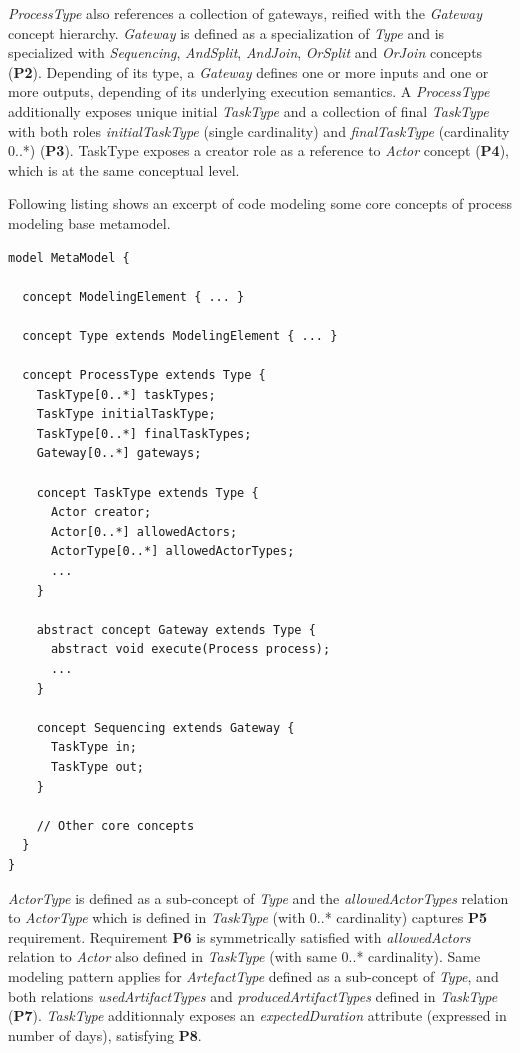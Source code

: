 \textit{ProcessType} also references a collection of gateways, reified with the \textit{Gateway} concept hierarchy. \textit{Gateway} is defined as a specialization of \textit{Type} and is specialized with \textit{Sequencing}, \textit{AndSplit}, \textit{AndJoin}, \textit{OrSplit} and \textit{OrJoin} concepts (\textbf{P2}). Depending of its type, a \textit{Gateway} defines one or more inputs and one or more outputs, depending of its underlying execution semantics. A \textit{ProcessType} additionally exposes unique initial \textit{TaskType} and a collection of final \textit{TaskType} with both roles \textit{initialTaskType} (single cardinality) and \textit{finalTaskType} (cardinality 0..*) (\textbf{P3}). TaskType exposes a creator role as a reference to \textit{Actor} concept (\textbf{P4}), which is at the same conceptual level. 

Following listing shows an excerpt of \FML code modeling some core concepts of process modeling base metamodel. 

\begin{lstlisting}
model MetaModel {

  concept ModelingElement { ... }
  
  concept Type extends ModelingElement { ... }
  
  concept ProcessType extends Type {
    TaskType[0..*] taskTypes;
    TaskType initialTaskType;
    TaskType[0..*] finalTaskTypes;
    Gateway[0..*] gateways;
        
    concept TaskType extends Type {
      Actor creator;
      Actor[0..*] allowedActors;
      ActorType[0..*] allowedActorTypes;
      ...
    }
        
    abstract concept Gateway extends Type {
      abstract void execute(Process process);
      ...
    }
        
    concept Sequencing extends Gateway {
      TaskType in;
      TaskType out;
    }
    
    // Other core concepts
  }
}    
\end{lstlisting}


\textit{ActorType} is defined as a sub-concept of \textit{Type} and the \textit{allowedActorTypes} relation to \textit{ActorType} which is defined in \textit{TaskType} (with 0..* cardinality) captures \textbf{P5} requirement. Requirement \textbf{P6} is symmetrically satisfied with \textit{allowedActors} relation to \textit{Actor} also defined in \textit{TaskType} (with same 0..* cardinality). Same modeling pattern applies for \textit{ArtefactType} defined as a sub-concept of \textit{Type}, and both relations \textit{usedArtifactTypes} and \textit{producedArtifactTypes} defined in \textit{TaskType} (\textbf{P7}). \textit{TaskType} additionnaly exposes an \textit{expectedDuration} attribute (expressed in number of days), satisfying \textbf{P8}. 

